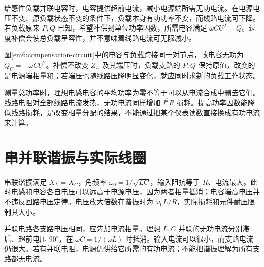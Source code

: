 给感性负载并联电容时，电容提供超前电流，减小电源端所需无功电流。在电源电压不变、原负载状态不变的条件下，负载本身有功功率不变，而线路电流可下降。若负载原来 $P,Q$ 已知，希望补偿到单位功率因数，所需电容满足 $\omega CU^2=Q$。过度补偿会使总负载呈容性，并不意味着线路电流可无限减小。

图\ref{em6:compensation-circuit}中的电容与负载跨接同一对节点，故电容无功为 $Q_C=-\omega CU^2$。补偿不改变 $Z_L$ 及其端压时，负载支路的 $P,Q$ 保持原值，改变的是电源端相量和；若端压也随线路压降明显变化，就应同时求新的负载工作状态。




测量总功率时，理想电感电容的平均功率为零不等于可以从电流合成中删去它们。线路电阻对全部线路电流发热，无功电流同样增加 $I^2R$ 损耗。提高功率因数能降低线路损耗，是改变相量分配的结果，不能通过把某个仪表读数直接换成有功电流来计算。


\section{串并联谐振与实际线圈}

串联谐振满足 $X_L=X_C$，角频率 $\omega_0=1/\sqrt{LC}$，输入阻抗等于 $R$、电流最大。此时电感和电容各自电压可以远高于电源电压，因为两者相量抵消；电容端高电压并不违反回路电压定律。电压放大倍数在谐振时为 $\omega_0L/R$，实际损耗和元件耐压限制其大小。

并联电路各支路电压相同，应先加电流相量。理想 $L,C$ 并联的无功电流分别滞后、超前电压 $90^\circ$，在 $\omega C=1/(\omega L)$ 时抵消。输入电流可以很小，而支路电流仍很大。若有并联电阻，电源仍供给它所需的有功电流；不能把谐振理解为所有支路都无电流。

